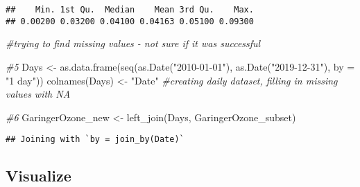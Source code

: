 \documentclass[
]{article}
\newenvironment{Shaded}{\begin{snugshade}}{\end{snugshade}}
\newcommand{\AttributeTok}[1]{\textcolor[rgb]{0.77,0.63,0.00}{#1}}
\newcommand{\CommentTok}[1]{\textcolor[rgb]{0.56,0.35,0.01}{\textit{#1}}}
\newcommand{\FloatTok}[1]{\textcolor[rgb]{0.00,0.00,0.81}{#1}}
\newcommand{\FunctionTok}[1]{\textcolor[rgb]{0.00,0.00,0.00}{#1}}
\newcommand{\NormalTok}[1]{#1}
\newcommand{\OtherTok}[1]{\textcolor[rgb]{0.56,0.35,0.01}{#1}}
\newcommand{\SpecialCharTok}[1]{\textcolor[rgb]{0.00,0.00,0.00}{#1}}
\newcommand{\StringTok}[1]{\textcolor[rgb]{0.31,0.60,0.02}{#1}}
\begin{document}
\begin{Shaded}
\end{Shaded}

\begin{verbatim}
##    Min. 1st Qu.  Median    Mean 3rd Qu.    Max. 
## 0.00200 0.03200 0.04100 0.04163 0.05100 0.09300
\end{verbatim}

\begin{Shaded}
\begin{Highlighting}[]
\CommentTok{\#trying to find missing values {-} not sure if it was successful}

\CommentTok{\#5}
\NormalTok{Days }\OtherTok{\textless{}{-}} \FunctionTok{as.data.frame}\NormalTok{(}\FunctionTok{seq}\NormalTok{(}\FunctionTok{as.Date}\NormalTok{(}\StringTok{"2010{-}01{-}01"}\NormalTok{), }\FunctionTok{as.Date}\NormalTok{(}\StringTok{"2019{-}12{-}31"}\NormalTok{), }\AttributeTok{by =} \StringTok{"1 day"}\NormalTok{))}
\FunctionTok{colnames}\NormalTok{(Days) }\OtherTok{\textless{}{-}} \StringTok{"Date"}
\CommentTok{\#creating daily dataset, filling in missing values with NA}

\CommentTok{\#6}
\NormalTok{GaringerOzone\_new }\OtherTok{\textless{}{-}} \FunctionTok{left\_join}\NormalTok{(Days, GaringerOzone\_subset)}
\end{Highlighting}
\end{Shaded}

\begin{verbatim}
## Joining with `by = join_by(Date)`
\end{verbatim}

\hypertarget{visualize}{%
\subsection{Visualize}\label{visualize}}
\end{document}
